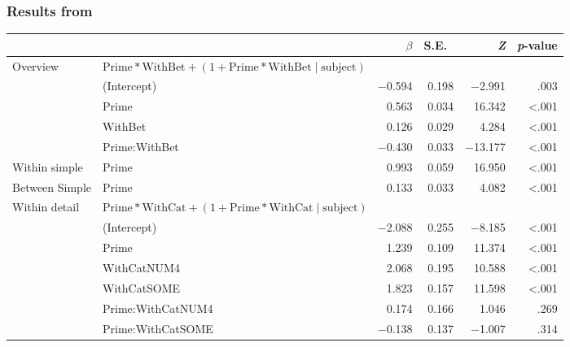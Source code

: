 \documentclass[noamssymb]{beamer}
\begin{document}
\begin{frame}

\end{frame}


\begin{frame}

  \frametitle{{\ftf Results from \textcite[125]{Bott:2016aa}}}

    \begin{adjustbox}{width=1\textwidth,center=\textwidth}
    \begin{tabular}{llrrrr}
      \hline
      & & \(\beta\) & S.E.\ & \emph{Z} & \emph{p}-value  \\
      \hline
      Overview & \(\text{Prime} * \text{WithBet} + (1 + \text{Prime} * \text{WithBet} \mid \text{subject})\) & & & \\
      & (Intercept) & \(-\)0.594 & 0.198 & \(-\)2.991 & .003 \\
      & Prime & 0.563 & 0.034 & 16.342 & <.001 \\
      & WithBet & 0.126 & 0.029 & 4.284 & <.001 \\
      & Prime:WithBet & \(-\)0.430 & 0.033 & \(-\)13.177 & <.001 \\
      Within simple & Prime & 0.993 & 0.059 & 16.950 & <.001 \\
      Between Simple & Prime & 0.133 & 0.033 & 4.082 & <.001 \\
      Within detail & \multicolumn{2}{l}{\(\text{Prime} * \text{WithCat} + (1 + \text{Prime} * \text{WithCat} \mid \text{subject})\)}  & & & \\
      & (Intercept)  & \(-\)2.088 & 0.255 & \(-\)8.185 & <.001\\
      & Prime & 1.239 & 0.109 & 11.374 & <.001 \\
      & WithCatNUM4 & 2.068 & 0.195 & 10.588 & <.001 \\
      & WithCatSOME & 1.823 & 0.157 & 11.598 & <.001 \\
      & Prime:WithCatNUM4 & 0.174 & 0.166 & 1.046 & .269 \\
      & Prime:WithCatSOME & \(-\)0.138 & 0.137 & \(-\)1.007 & .314 \\

\end{tabular}
\end{adjustbox}
\end{frame}
\end{document}
